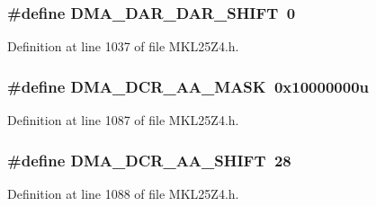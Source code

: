 \subsubsection[{\texorpdfstring{D\+M\+A\+\_\+\+D\+A\+R\+\_\+\+D\+A\+R\+\_\+\+S\+H\+I\+FT}{DMA_DAR_DAR_SHIFT}}]{\setlength{\rightskip}{0pt plus 5cm}\#define D\+M\+A\+\_\+\+D\+A\+R\+\_\+\+D\+A\+R\+\_\+\+S\+H\+I\+FT~0}\hypertarget{group___d_m_a___register___masks_ga6dc575769385f559893116dabe37a002}{}\label{group___d_m_a___register___masks_ga6dc575769385f559893116dabe37a002}


Definition at line 1037 of file M\+K\+L25\+Z4.\+h.

\subsubsection[{\texorpdfstring{D\+M\+A\+\_\+\+D\+C\+R\+\_\+\+A\+A\+\_\+\+M\+A\+SK}{DMA_DCR_AA_MASK}}]{\setlength{\rightskip}{0pt plus 5cm}\#define D\+M\+A\+\_\+\+D\+C\+R\+\_\+\+A\+A\+\_\+\+M\+A\+SK~0x10000000u}\hypertarget{group___d_m_a___register___masks_gaa6a92e7768984e640413eea5ef5da08b}{}\label{group___d_m_a___register___masks_gaa6a92e7768984e640413eea5ef5da08b}


Definition at line 1087 of file M\+K\+L25\+Z4.\+h.

\subsubsection[{\texorpdfstring{D\+M\+A\+\_\+\+D\+C\+R\+\_\+\+A\+A\+\_\+\+S\+H\+I\+FT}{DMA_DCR_AA_SHIFT}}]{\setlength{\rightskip}{0pt plus 5cm}\#define D\+M\+A\+\_\+\+D\+C\+R\+\_\+\+A\+A\+\_\+\+S\+H\+I\+FT~28}\hypertarget{group___d_m_a___register___masks_gafe71d9df8ce9ecf93c694cd325f50309}{}\label{group___d_m_a___register___masks_gafe71d9df8ce9ecf93c694cd325f50309}


Definition at line 1088 of file M\+K\+L25\+Z4.\+h.

